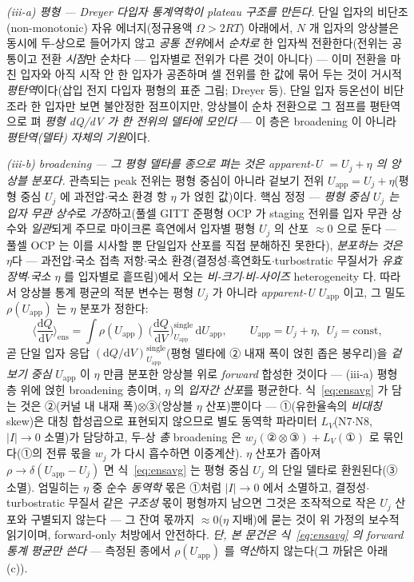 \documentclass[11pt,a4paper]{article}
\newcommand{\dd}{\mathrm{d}}
\newcommand{\app}{\mathrm{app}}
\begin{document}
\emph{(iii-a) 평형 — Dreyer 다입자 통계역학이 \emph{plateau 구조}를 만든다.} 단일 입자의 비단조(non-monotonic) 자유
에너지(정규용액 $\Omega>2RT$) 아래에서, $N$ 개 입자의 앙상블은 동시에 두-상으로 들어가지 않고 \emph{공통 전위}에서
\emph{순차로} 한 입자씩 전환한다(전위는 공통이고 전환 \emph{시점}만 순차다 — 입자별로 전위가 다른 것이 아니다) —
이미 전환을 마친 입자와 아직 시작 안 한 입자가 공존하며 셀 전위를 한 값에 묶어 두는
것이 거시적 \emph{평탄역}이다(삽입 전지 다입자 평형의 표준 그림; Dreyer 등\cite{dreyer2010}).
단일 입자 등온선이 비단조라 한 입자만 보면 불안정한 점프이지만, 앙상블이 순차 전환으로 그 점프를
평탄역으로 펴 \emph{평형 dQ/dV 가 한 전위의 델타에 모인다} — 이 층은 broadening 이 아니라 \emph{평탄역(델타) 자체의 기원}이다.

\emph{(iii-b) broadening — 그 평형 델타를 종으로 펴는 것은 \emph{apparent-U $=U_j+\eta$} 의 앙상블 분포다.} 관측되는 peak
전위는 평형 중심이 아니라 겉보기 전위 $U_\app=U_j+\eta$(평형 중심 $U_j$ 에 과전압$\cdot$국소 환경 항 $\eta$ 가 얹힌
값)이다. 핵심 정정 — \emph{평형 중심 $U_j$ 는 입자 무관 상수}로 \emph{가정}하고(풀셀 GITT 준평형 OCP 가 staging 전위를
입자 무관 상수와 \emph{일관}되게 주므로\cite{park2021} 마이크론 흑연에서 입자별 평형 $U_j$ 의 산포 $\approx0$ 으로 둔다 —
풀셀 OCP 는 이를 시사할 뿐 단일입자 산포를 직접 분해하진 못한다), \emph{분포하는 것은 $\eta$}다 —
과전압$\cdot$국소 접촉 저항$\cdot$국소 환경(결정성$\cdot$흑연화도$\cdot$turbostratic 무질서가 \emph{유효 장벽$\cdot$국소
$\eta$} 를 입자별로 흩뜨림)에서 오는 \emph{비-크기$\cdot$비-사이즈} heterogeneity 다. 따라서 앙상블 통계 평균의 적분
변수는 평형 $U_j$ 가 아니라 \emph{apparent-U} $U_\app$ 이고, 그 밀도 $\rho(U_\app)$ 는 $\eta$ 분포가 정한다:
\begin{equation}
\Big\langle\frac{\dd Q}{\dd V}\Big\rangle_\mathrm{ens}
=\int \rho(U_\app)\;\Big(\frac{\dd Q}{\dd V}\Big)^\mathrm{single}_{U_\app}\,\dd U_\app,
\qquad U_\app=U_j+\eta,\ \ U_j=\text{const},
\label{eq:ensavg}
\end{equation}
곧 단일 입자 응답 $(\dd Q/\dd V)^\mathrm{single}_{U_\app}$(평형 델타에 ② 내재 폭이 얹힌 좁은 봉우리)을 \emph{겉보기 중심}
$U_\app$ 이 $\eta$ 만큼 분포한 앙상블 위로 \emph{forward} 합성한 것이다 — (iii-a) 평형 층 위에 얹힌
broadening 층이며, $\eta$ 의 \emph{입자간 산포}를 평균한다. 식~\eqref{eq:ensavg} 가 담는 것은
②(커널 내 내재 폭)$\otimes$③(앙상블 $\eta$ 산포)뿐이다 — ①(유한율속의 \emph{비대칭} skew)은 대칭 합성곱으로
표현되지 않으므로 별도 동역학 파라미터 $L_V$(N7$\cdot$N8, $|I|\!\to\!0$ 소멸)가 담당하고, 두-상 \emph{총}
broadening 은 $w_j(\text{②}\otimes\text{③})+L_V(\text{①})$ 로 묶인다(①의 전류 몫을 $w_j$ 가 다시 흡수하면
이중계산). $\eta$ 산포가 좁아져 $\rho\!\to\!\delta(U_\app-U_j)$ 면 식~\eqref{eq:ensavg} 는 평형 중심 $U_j$
의 단일 델타로 환원된다(③ 소멸).
엄밀히는 $\eta$ 중 순수 \emph{동역학} 몫은 ①처럼 $|I|\!\to\!0$ 에서 소멸하고, 결정성$\cdot$turbostratic 무질서 같은
\emph{구조성} 몫이 평형까지 남으면 그것은 조작적으로 작은 $U_j$ 산포와 구별되지 않는다 — 그 잔여 몫까지
$\approx0$($\eta$ 지배)에 묻는 것이 위 가정의 보수적 읽기이며, forward-only 처방에서 안전하다. \emph{단, 본 문건은 식~\eqref{eq:ensavg} 의 forward 통계 평균만
쓴다} — 측정된 종에서 $\rho(U_\app)$ 를 \emph{역산}하지 않는다(그 까닭은 아래 (c)).
\end{document}
